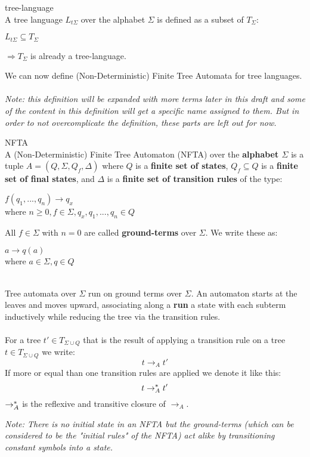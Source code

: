 \documentclass{llncs}
\begin{document}
\begin{definition}{tree-language \cite{automata-xml}}
	\\
	A tree language \(L_{t\Sigma}\) over the alphabet \(\Sigma\) is defined as a subset of \(T_\Sigma\):
	\begin{center}
		\(L_{t\Sigma} \subseteq T_\Sigma\)
	\end{center}
	\(\Rightarrow T_\Sigma\) is already a tree-language.	
\end{definition}

\pagebreak
We can now define (Non-Deterministic) Finite Tree Automata for tree languages.
\\
\\
\textit{Note: this definition will be expanded with more terms later in this draft and some of the content in this definition will get a specific name assigned to them. But in order to not overcomplicate the definition, these parts are left out for now.}

\begin{definition}{NFTA \cite{tata-nfta}}
	\\
	A (Non-Deterministic) Finite Tree Automaton (NFTA) over the \textbf{alphabet \(\Sigma\)} is a tuple \(A = (Q, \Sigma, Q_f ,\Delta)\) where
	\(Q\) is a \textbf{finite set of states}, \(Q_f \subseteq Q\) is a  \textbf{finite set of final states}, and \(\Delta\) is a \textbf{finite set of transition rules} of the type:
	
	\begin{center}
		\(f(q_1,...,q_n) \rightarrow q_x\) \\
		where \(n \ge 0, f \in \Sigma, q_x, q_1,...,q_n \in Q \)
	\end{center}
		All \(f \in \Sigma\) with \(n = 0\) are called \textbf{ground-terms} over \(\Sigma\). We write these as:
	\begin{center}
		\(a \rightarrow q(a)\) \\
		where  \(a \in \Sigma, q \in Q \)
	\end{center}
	~\\
	Tree automata over \(\Sigma\) run on ground terms over \(\Sigma\). An automaton starts at
	the leaves and moves upward, associating along a \textbf{run} a state with each subterm
	inductively while reducing the tree via the transition rules.
	\\\\
	For a tree $t' \in T_{\Sigma \cup Q}$ that is the result of applying a transition rule on a tree $t \in T_{\Sigma \cup Q}$ we write:
		$$t \rightarrow_A t'$$
	If more or equal than one transition rules are applied we denote it like this:
		$$t \rightarrow_A^* t'$$	
	$\rightarrow_A^*$ is the reflexive and transitive closure of $\rightarrow_A$.\\
\end{definition}
\textit{
	Note: There is no initial state in an NFTA but the ground-terms (which can be considered to be the "initial rules" of the NFTA) act alike by transitioning constant symbols into a state.
}
\\
\end{document}
